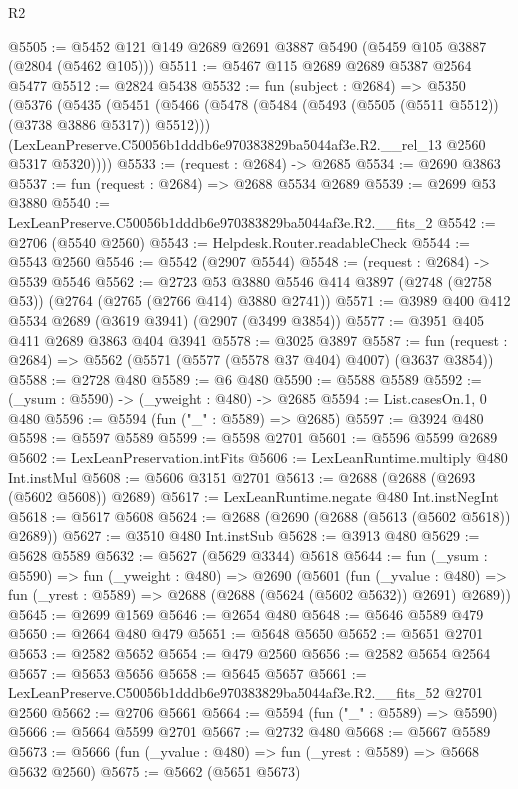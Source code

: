 \begin{lexlean}{R2}
\begin{coremodule}
@5505 := @5452 @121 @149 @2689 @2691 @3887 @5490 (@5459 @105 @3887 (@2804 (@5462 @105)))
@5511 := @5467 @115 @2689 @2689 @5387 @2564 @5477
@5512 := @2824 @5438
@5532 := fun (subject : @2684) =>
  @5350
    (@5376
      (@5435
        (@5451
          (@5466 (@5478 (@5484 (@5493 (@5505 (@5511 @5512)) (@3738 @3886 @5317)) @5512)))
          (LexLeanPreserve.C50056b1dddb6e970383829ba5044af3e.R2.__rel_13 @2560 @5317 @5320))))
@5533 := (request : @2684) -> @2685
@5534 := @2690 @3863
@5537 := fun (request : @2684) => @2688 @5534 @2689
@5539 := @2699 @53 @3880
@5540 := LexLeanPreserve.C50056b1dddb6e970383829ba5044af3e.R2.__fits_2
@5542 := @2706 (@5540 @2560)
@5543 := Helpdesk.Router.readableCheck
@5544 := @5543 @2560
@5546 := @5542 (@2907 @5544)
@5548 := (request : @2684) -> @5539 @5546
@5562 := @2723
    @53
    @3880
    @5546
    @414
    @3897
    (@2748 (@2758 @53))
    (@2764 (@2765 (@2766 @414) @3880 @2741))
@5571 := @3989 @400 @412 @5534 @2689 (@3619 @3941) (@2907 (@3499 @3854))
@5577 := @3951 @405 @411 @2689 @3863 @404 @3941
@5578 := @3025 @3897
@5587 := fun (request : @2684) => @5562 (@5571 (@5577 (@5578 @37 @404) @4007) (@3637 @3854))
@5588 := @2728 @480
@5589 := @6 @480
@5590 := @5588 @5589
@5592 := (_ysum : @5590) -> (_yweight : @480) -> @2685
@5594 := List.casesOn.{1, 0} @480
@5596 := @5594 (fun ("_" : @5589) => @2685)
@5597 := @3924 @480
@5598 := @5597 @5589
@5599 := @5598 @2701
@5601 := @5596 @5599 @2689
@5602 := LexLeanPreservation.intFits
@5606 := LexLeanRuntime.multiply @480 Int.instMul
@5608 := @5606 @3151 @2701
@5613 := @2688 (@2688 (@2693 (@5602 @5608)) @2689)
@5617 := LexLeanRuntime.negate @480 Int.instNegInt
@5618 := @5617 @5608
@5624 := @2688 (@2690 (@2688 (@5613 (@5602 @5618)) @2689))
@5627 := @3510 @480 Int.instSub
@5628 := @3913 @480
@5629 := @5628 @5589
@5632 := @5627 (@5629 @3344) @5618
@5644 := fun (_ysum : @5590) =>
  fun (_yweight : @480) =>
  @2690
    (@5601
      (fun (_yvalue : @480) =>
      fun (_yrest : @5589) => @2688 (@2688 (@5624 (@5602 @5632)) @2691) @2689))
@5645 := @2699 @1569
@5646 := @2654 @480
@5648 := @5646 @5589 @479
@5650 := @2664 @480 @479
@5651 := @5648 @5650
@5652 := @5651 @2701
@5653 := @2582 @5652
@5654 := @479 @2560
@5656 := @2582 @5654 @2564
@5657 := @5653 @5656
@5658 := @5645 @5657
@5661 := LexLeanPreserve.C50056b1dddb6e970383829ba5044af3e.R2.__fits_52 @2701 @2560
@5662 := @2706 @5661
@5664 := @5594 (fun ("_" : @5589) => @5590)
@5666 := @5664 @5599 @2701
@5667 := @2732 @480
@5668 := @5667 @5589
@5673 := @5666 (fun (_yvalue : @480) => fun (_yrest : @5589) => @5668 @5632 @2560)
@5675 := @5662 (@5651 @5673)

\end{coremodule}
\end{lexlean}
